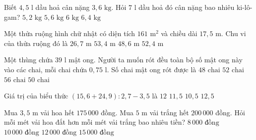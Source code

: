 \begin{ex} %
Biết $4{,}5\text{ l}$ dầu hoả cân nặng $3{,}6\text{ kg}$. Hỏi $7\text{ l}$ dầu hoả đó cân nặng bao nhiêu ki-lô-gam?
\choice
{$5{,}2\text{ kg}$}
{\True $5{,}6\text{ kg}$}
{$6\text{ kg}$}
{$6{,}4\text{ kg}$}
\end{ex}

\begin{ex} %
Một thửa ruộng hình chữ nhật có diện tích $161\text{ m}^2$ và chiều dài $17{,}5\text{ m}$. Chu vi của thửa ruộng đó là
\choice
{$26{,}7\text{ m}$}
{\True $53{,}4\text{ m}$}
{$48{,}6\text{ m}$}
{$52{,}4\text{ m}$}
\end{ex}

\begin{ex} %
Một thùng chứa $39\text{ l}$ mật ong. Người ta muốn rót đều toàn bộ số mật ong này vào các chai, mỗi chai chứa $0{,}75\text{ l}$. Số chai mật ong rót được là
\choice
{$48\text{ chai}$}
{\True $52\text{ chai}$}
{$56\text{ chai}$}
{$50\text{ chai}$}
\end{ex}

\begin{ex} %
Giá trị của biểu thức $(15{,}6 + 24{,}9) : 2{,}7 - 3{,}5$ là
\choice
{$12$}
{\True $11{,}5$}
{$10{,}5$}
{$12{,}5$}
\end{ex}

\begin{ex} %
Mua $3{,}5\text{ m}$ vải hoa hết $175\,000$ đồng. Mua $5\text{ m}$ vải trắng hết $200\,000$ đồng. Hỏi mỗi mét vải hoa đắt hơn mỗi mét vải trắng bao nhiêu tiền?
\choice
{$8\,000\text{ đồng}$}
{\True $10\,000\text{ đồng}$}
{$12\,000\text{ đồng}$}
{$15\,000\text{ đồng}$}
\end{ex}

